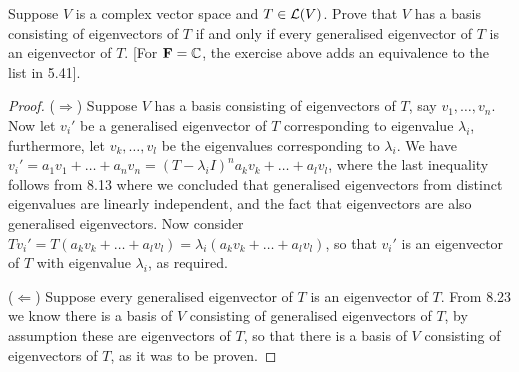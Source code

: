 \begin{exercise}{5}
  Suppose $V$ is a complex vector space and $T\in\mathcal{L}(V)$. Prove that $V$ has a basis consisting of eigenvectors of $T$ if and only if every generalised eigenvector of $T$ is an eigenvector of $T$. [For $\mathbf{F}=\mathbb{C}$, the exercise above adds an equivalence to the list in 5.41].
\end{exercise}
\begin{proof}
 ($\Rightarrow$) Suppose $V$ has a basis consisting of eigenvectors of $T$, say $v_1,\dots,v_n$. Now let $v_i'$ be a generalised eigenvector of $T$ corresponding to eigenvalue $\lambda_i$, furthermore, let $v_k,\dots,v_l$ be the eigenvalues corresponding to $\lambda_i$. We have $v_i' =a_1v_1+\dots+a_nv_n =(T-\lambda_i I)^n a_kv_k+\dots+a_lv_l$, where the last inequality follows from 8.13 where we concluded that generalised eigenvectors from distinct eigenvalues are linearly independent, and the fact that eigenvectors are also generalised eigenvectors. Now consider $Tv_i' =T(a_kv_k+\dots+a_lv_l) =\lambda_i(a_kv_k+\dots+a_lv_l)$, so that $v_i'$ is an eigenvector of $T$ with eigenvalue $\lambda_i$, as required.

 ($\Leftarrow$) Suppose every generalised eigenvector of $T$ is an eigenvector of $T$. From 8.23 we know there is a basis of $V$ consisting of generalised eigenvectors of $T$, by assumption these are eigenvectors of $T$, so that there is a basis of $V$ consisting of eigenvectors of $T$, as it was to be proven.
\end{proof}

